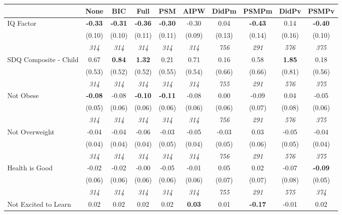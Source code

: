 \begin{tabular}{l c c c c c c c c c}
\toprule
 & None & BIC & Full & PSM & AIPW & DidPm & PSMPm & DidPv & PSMPv \\
\midrule
IQ Factor & \textbf{ -0.33 } & \textbf{ -0.31 } & \textbf{ -0.36 } & \textbf{-0.30} & -0.30 & 0.04 & \textbf{-0.43} & 0.14 & \textbf{-0.40} \\
& (0.10) & (0.10) & (0.11) & (0.11) & (0.09) & (0.13) & (0.14) & (0.16) & (0.10) \\
& \textit{ 314 } & \textit{ 314 } & \textit{ 314 } & \textit{ 314 } & \textit{ 314 } & \textit{ 756 } & \textit{ 291 } & \textit{ 576 } & \textit{ 375 } \\
SDQ Composite - Child & 0.67 & \textbf{ 0.84 } & \textbf{ 1.32 } & 0.21 & 0.71 & 0.16 & 0.58 & \textbf{ 1.85 } & 0.18 \\
& (0.53) & (0.52) & (0.52) & (0.55) & (0.54) & (0.66) & (0.66) & (0.81) & (0.56) \\
& \textit{ 314 } & \textit{ 314 } & \textit{ 314 } & \textit{ 314 } & \textit{ 314 } & \textit{ 755 } & \textit{ 291 } & \textit{ 576 } & \textit{ 375 } \\
Not Obese & \textbf{ -0.08 } & -0.08 & \textbf{ -0.10 } & \textbf{-0.11} & -0.08 & 0.00 & -0.09 & 0.04 & -0.05 \\
& (0.05) & (0.06) & (0.06) & (0.06) & (0.06) & (0.06) & (0.07) & (0.08) & (0.06) \\
& \textit{ 314 } & \textit{ 314 } & \textit{ 314 } & \textit{ 314 } & \textit{ 314 } & \textit{ 756 } & \textit{ 291 } & \textit{ 576 } & \textit{ 375 } \\
Not Overweight & -0.04 & -0.04 & -0.06 & -0.03 & -0.05 & -0.03 & 0.03 & -0.05 & -0.04 \\
& (0.04) & (0.04) & (0.04) & (0.05) & (0.04) & (0.05) & (0.06) & (0.05) & (0.04) \\
& \textit{ 314 } & \textit{ 314 } & \textit{ 314 } & \textit{ 314 } & \textit{ 314 } & \textit{ 756 } & \textit{ 291 } & \textit{ 576 } & \textit{ 375 } \\
Health is Good & -0.02 & -0.02 & -0.00 & -0.05 & -0.01 & 0.05 & 0.02 & -0.07 & \textbf{-0.09} \\
& (0.06) & (0.06) & (0.06) & (0.06) & (0.06) & (0.07) & (0.07) & (0.08) & (0.05) \\
& \textit{ 314 } & \textit{ 314 } & \textit{ 314 } & \textit{ 314 } & \textit{ 314 } & \textit{ 755 } & \textit{ 291 } & \textit{ 575 } & \textit{ 374 } \\
Not Excited to Learn & 0.02 & 0.02 & 0.02 & 0.02 & \textbf{0.03} & 0.01 & \textbf{-0.17} & -0.01 & 0.02 \\

\end{tabular}
